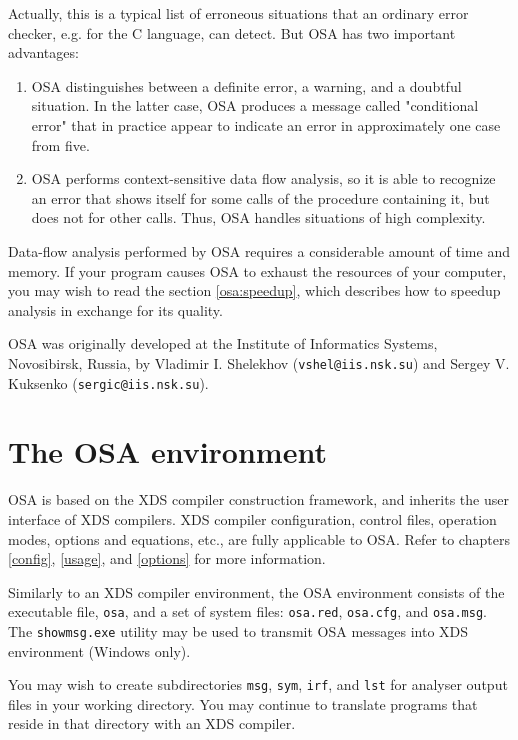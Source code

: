 Actually, this is a typical list of erroneous situations that an ordinary
error checker, e.g. for the C language, can detect. But OSA has two
important advantages:
\begin{enumerate}
\item OSA distinguishes between a definite error, a warning, and a
      doubtful situation. In the latter case, OSA produces a message called 
      "conditional error" that in practice appear to indicate an error
      in approximately one case from five.

\item OSA performs context-sensitive data flow analysis, so it is able to
      recognize an error that shows itself for some calls of the 
      procedure containing it, but does not for other calls. 
      Thus, OSA handles situations of high complexity.
\end{enumerate}

Data-flow analysis performed by OSA requires a considerable amount of
time and memory. If your program causes OSA to exhaust the resources 
of your computer, you may wish to read the section \ref{osa:speedup}, which
describes how to speedup analysis in exchange for its quality.

OSA was originally developed at the Institute of Informatics Systems,
Novosibirsk, Russia, by Vladimir I. Shelekhov (\verb'vshel@iis.nsk.su') and
Sergey V. Kuksenko (\verb'sergic@iis.nsk.su').

\section{The OSA environment}
\label{osa:env}

OSA is based on the XDS compiler construction framework,
and inherits the user interface of XDS compilers.
XDS compiler configuration, control files, operation modes,
options and equations, etc., are fully applicable to OSA.
Refer to chapters \ref{config}, \ref{usage}, and \ref{options}
for more information.

Similarly to an XDS compiler environment, the OSA environment consists of
the executable file, {\tt osa\dotExe{}}, and a set of system files: 
\verb'osa.red', \verb'osa.cfg', and \verb'osa.msg'. The \verb'showmsg.exe' 
utility may be used to transmit OSA messages into XDS environment 
(Windows only).

You may wish to create subdirectories \verb'msg', \verb'sym', \verb'irf', 
and \verb'lst' for analyser output files in your working directory. 
You may continue to translate programs that reside in that directory 
with an XDS compiler.

